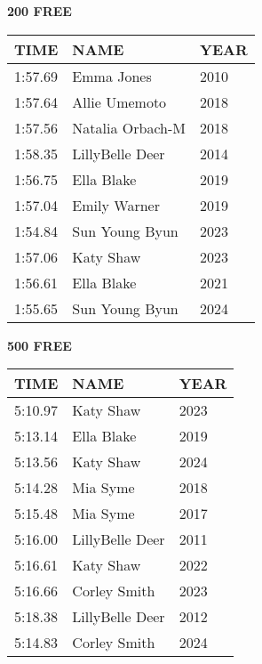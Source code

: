 \vspace{0.4cm}

\begin{minipage}[t]{0.48\textwidth}
\centering
\textbf{200 FREE}\\[0.05cm]
\begin{tabular}{@{}p{1.8cm}p{2.8cm}p{1.2cm}@{}}
\hline
\textbf{TIME} & \textbf{NAME} & \textbf{YEAR} \\
\hline
1:57.69 & Emma Jones & 2010 \\
1:57.64 & Allie Umemoto & 2018 \\
1:57.56 & Natalia Orbach-M & 2018 \\
1:58.35 & LillyBelle Deer & 2014 \\
1:56.75 & Ella Blake & 2019 \\
1:57.04 & Emily Warner & 2019 \\
1:54.84 & Sun Young Byun & 2023 \\
1:57.06 & Katy Shaw & 2023 \\
1:56.61 & Ella Blake & 2021 \\
1:55.65 & Sun Young Byun & 2024 \\
\hline
\end{tabular}
\end{minipage}\hfill
\begin{minipage}[t]{0.48\textwidth}
\centering
\textbf{500 FREE}\\[0.05cm]
\begin{tabular}{@{}p{1.8cm}p{2.8cm}p{1.2cm}@{}}
\hline
\textbf{TIME} & \textbf{NAME} & \textbf{YEAR} \\
\hline
5:10.97 & Katy Shaw & 2023 \\
5:13.14 & Ella Blake & 2019 \\
5:13.56 & Katy Shaw & 2024 \\
5:14.28 & Mia Syme & 2018 \\
5:15.48 & Mia Syme & 2017 \\
5:16.00 & LillyBelle Deer & 2011 \\
5:16.61 & Katy Shaw & 2022 \\
5:16.66 & Corley Smith & 2023 \\
5:18.38 & LillyBelle Deer & 2012 \\
5:14.83 & Corley Smith & 2024 \\
\hline
\end{tabular}
\end{minipage}

\vspace{0.4cm}

